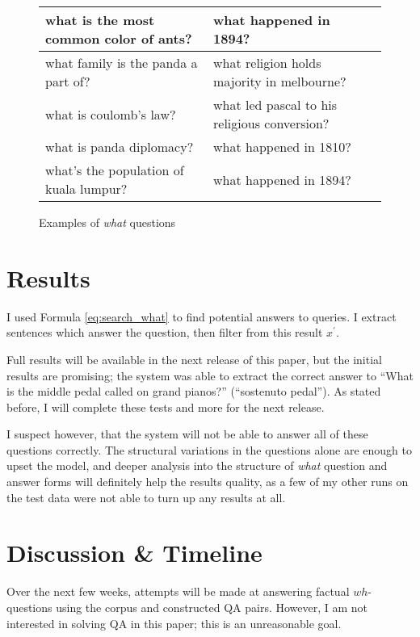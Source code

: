 \documentclass[twoside]{article}
\begin{document}
\begin{figure}
\caption{Examples of \textit{what} questions \label{fig:whatqs}}
\begin{tabular}{|l|l|l|}
\hline
what is the most common color of ants? & what happened in 1894? \\ \hline
what family is the panda a part of? & what religion holds majority in melbourne? \\ \hline
what is coulomb's law? & what led pascal to his religious conversion? \\ \hline
what is panda diplomacy? & what happened in 1810? \\ \hline
what's the population of kuala lumpur? & what happened in 1894? \\ \hline
\end{tabular}
\end{figure}


\section{Results}

I used Formula \ref{eq:search_what} to find potential answers to queries.  I extract sentences which answer the question, then filter from this result $x^\prime$.

Full results will be available in the next release of this paper, but the initial results are promising; the system was able to extract the correct answer to ``What is the middle pedal called on grand pianos?'' (``sostenuto pedal'').  As stated before, I will complete these tests and more for the next release.

I suspect however, that the system will not be able to answer all of these questions correctly.  The structural variations in the questions alone are enough to upset the model, and deeper analysis into the structure of \textit{what} question and answer forms will definitely help the results quality, as a few of my other runs on the test data were not able to turn up any results at all.

\section{Discussion \& Timeline}

Over the next few weeks, attempts will be made at answering factual $wh$-questions using the corpus and constructed QA pairs.  However, I am not interested in solving QA in this paper;  this is an unreasonable goal.
\end{document}
